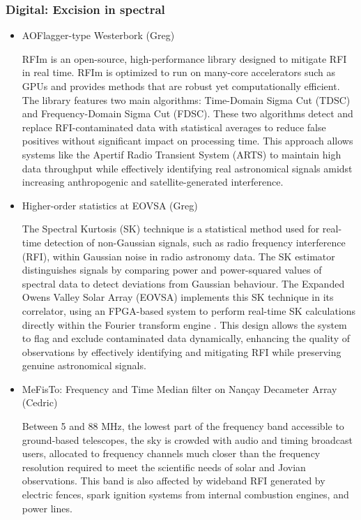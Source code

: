 \subsubsection{Digital: Excision in spectral}
\begin{itemize}
\item AOFlagger-type Westerbork (Greg)

 RFIm \cite{sclocco2019real} is an open-source, high-performance library designed to mitigate RFI in real time. RFIm is optimized to run on many-core accelerators such as GPUs and provides methods that are robust yet computationally efficient. The library features two main algorithms: Time-Domain Sigma Cut (TDSC) and Frequency-Domain Sigma Cut (FDSC). These two algorithms detect and replace RFI-contaminated data with statistical averages to reduce false positives without significant impact on processing time. This approach allows systems like the Apertif Radio Transient System (ARTS) to maintain high data throughput while effectively identifying real astronomical signals amidst increasing anthropogenic and satellite-generated interference.
 
\item Higher-order statistics at EOVSA (Greg)

The Spectral Kurtosis (SK) technique is a statistical method used for real-time detection of non-Gaussian signals, such as radio frequency interference (RFI), within Gaussian noise in radio astronomy data. The SK estimator distinguishes signals by comparing power and power-squared values of spectral data to detect deviations from Gaussian behaviour. The Expanded Owens Valley Solar Array (EOVSA) implements this SK technique in its correlator, using an FPGA-based system to perform real-time SK calculations directly within the Fourier transform engine \cite{}. This design allows the system to flag and exclude contaminated data dynamically, enhancing the quality of observations by effectively identifying and mitigating RFI while preserving genuine astronomical signals.

\item MeFisTo: Frequency and Time Median filter on Nançay Decameter Array (Cedric)

Between 5 and 88 MHz, the lowest part of the frequency band accessible to ground-based telescopes, the sky is crowded with audio and timing broadcast users, allocated to frequency channels much closer than the frequency resolution required to meet the scientific needs of solar and Jovian observations. This band is also affected by wideband RFI generated by electric fences, spark ignition systems from internal combustion engines, and power lines.


\end{itemize}
